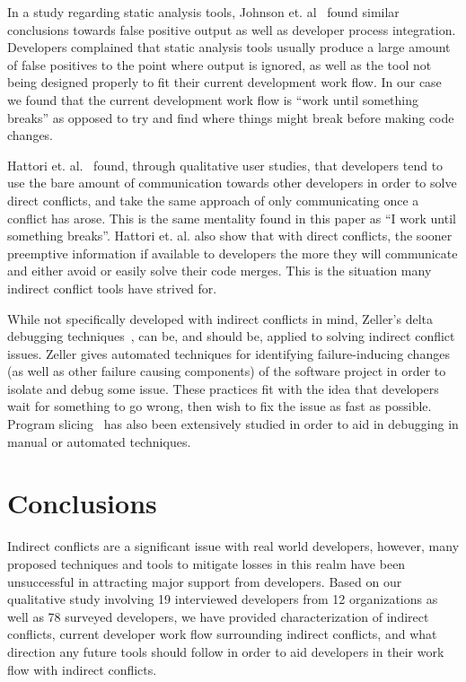 \documentclass[conference]{IEEEtran}
\begin{document}
In a study regarding static analysis tools, Johnson et. al~\cite{Johnson:2013:WDS} found similar conclusions towards false positive output
as well as developer process integration. Developers complained that static analysis tools usually produce a large amount of false
positives to the point where output is ignored, as well as the tool not being designed properly to fit their current development work
flow. In our case we found that the current development work flow is ``work until something breaks'' as opposed to try and find where things
might break before making code changes.

Hattori et. al.~\cite{Hattori:2012:ICG} found, through qualitative user studies, that developers tend to use the bare amount of communication
towards other developers in order to solve direct conflicts, and take the same approach of only communicating once a conflict has arose. This
is the same mentality found in this paper as ``I work until something breaks''. Hattori et. al. also show that with direct conflicts, the
sooner preemptive information if available to developers the more they will communicate and either avoid or easily solve their code merges.
This is the situation many indirect conflict tools have strived for.

While not specifically developed with indirect conflicts in mind, Zeller's delta debugging techniques~\cite{Zeller:2005:WPF}, 
can be, and should be, applied to solving indirect conflict issues. Zeller gives automated techniques for identifying failure-inducing
changes (as well as other failure causing components) of the software project in order to isolate and debug some issue. These practices fit
with the idea that developers wait for something to go wrong, then wish to fix the issue as fast as possible. Program slicing~\cite{Xu:2005:BSP}
has also been extensively studied in order to aid in debugging in manual or automated techniques.

\section{Conclusions}
\label{sec:conc}

Indirect conflicts are a significant issue with real world developers, however, many proposed techniques and tools to mitigate
losses in this realm have been unsuccessful in attracting major support from developers. Based on our qualitative study involving
19 interviewed developers from 12 organizations as well as 78 surveyed developers, we have provided characterization of indirect conflicts,
current developer work flow surrounding indirect conflicts, and what direction any future tools should follow in order to aid developers
in their work flow with indirect conflicts.
\end{document}
